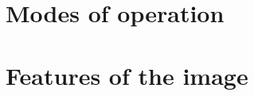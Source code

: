 \documentclass{emulateapj}
\begin{document}
\section{Modes of operation}

\section{Features of the image}





\end{document}
